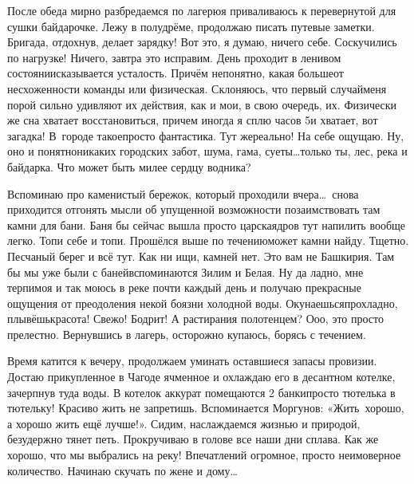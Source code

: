 После обеда мирно разбредаемся по лагерю\mdash я приваливаюсь к перевернутой для сушки байдарочке. Лежу в полудрёме, продолжаю писать путевые заметки. Бригада, отдохнув, делает зарядку! Вот это, я думаю, ничего себе. Соскучились по нагрузке! Ничего, завтра это исправим. День проходит в ленивом состоянии\mdash сказывается усталость. Причём непонятно, какая больше\mdash от несхоженности команды или физическая. Склоняюсь, что первый случай\mdash меня порой сильно удивляют их действия, как и мои, в свою очередь, их. Физически же сна хватает восстановиться, причем иногда я сплю часов 5\mdash и хватает, вот загадка! В~городе такое\mdash просто фантастика. Тут же\mdash реально! На себе ощущаю. Ну, оно и понятно\mdash никаких городских забот, шума, гама, суеты\ldots только ты, лес, река и байдарка. Что может быть милее сердцу водника? 

Вспоминаю про каменистый бережок, который проходили вчера\ldots~снова приходится отгонять мысли об упущенной возможности позаимствовать там камни для бани. Баня бы сейчас вышла просто царская\mdash дров тут напилить вообще легко. Топи себе и топи. Прошёлся выше по течению\mdash может камни найду. Тщетно. Песчаный берег и всё тут. Как ни ищи, камней нет. Это вам не Башкирия. Там бы мы уже были с баней\mdash вспоминаются Зилим и Белая. Ну да ладно, мне терпимо\mdash я и так моюсь в реке почти каждый день и получаю прекрасные ощущения от преодоления некой боязни холодной воды. Окунаешься\mdash прохладно, плывёшь\mdash красота! Свежо! Бодрит! А растирания полотенцем? О\sdash о\sdash о, это просто прелестно. Вернувшись в лагерь, осторожно купаюсь, борясь с течением. 

Время катится к вечеру, продолжаем уминать оставшиеся запасы провизии. Достаю прикупленное в Чагоде ячменное и охлаждаю его в десантном котелке, зачерпнув туда воды. В котелок аккурат помещаются 2 банки\mdash просто тютелька в тютельку! Красиво жить не запретишь. Вспоминается Моргунов: «Жить~хорошо, а хорошо жить ещё лучше!». Сидим, наслаждаемся жизнью и природой, безудержно тянет петь. Прокручиваю в голове все наши дни сплава. Как же хорошо, что мы выбрались на реку! Впечатлений огромное, просто неимоверное количество. Начинаю скучать по жене и дому\ldots~

